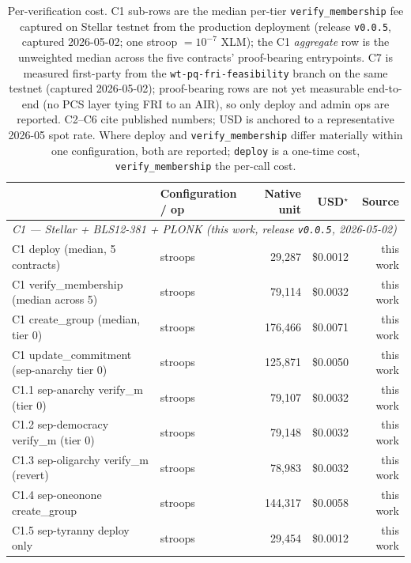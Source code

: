 \begin{table}[t]
  \centering
  \caption{Per-verification cost. C1 sub-rows are the median per-tier
    \texttt{verify\_membership} fee captured on Stellar testnet from
    the production deployment (release \texttt{v0.0.5}, captured
    2026-05-02; one stroop $=10^{-7}$ XLM); the C1 \emph{aggregate}
    row is the unweighted median across the five contracts'
    proof-bearing entrypoints. C7 is measured first-party from the
    \texttt{wt-pq-fri-feasibility} branch on the same testnet
    (captured 2026-05-02); proof-bearing rows are not yet measurable
    end-to-end (no PCS layer tying FRI to an AIR), so only deploy and
    admin ops are reported. C2--C6 cite published numbers; USD is
    anchored to a representative 2026-05 spot rate. Where deploy and
    \texttt{verify\_membership} differ materially within one
    configuration, both are reported; \texttt{deploy} is a
    one-time cost, \texttt{verify\_membership} the per-call cost.}
  \label{tab:cost}
  \begin{tabular}{llrrr}
    \toprule
    & Configuration / op & Native unit & USD$^\star$ & Source \\
    \midrule
    \multicolumn{5}{l}{\emph{C1 --- Stellar + BLS12-381 + PLONK (this work, release \texttt{v0.0.5}, 2026-05-02)}} \\
    \quad C1 deploy (median, 5 contracts)              & stroops   & 29{,}287    & \$0.0012  & this work \\
    \quad C1 verify\_membership (median across 5)      & stroops   & 79{,}114    & \$0.0032  & this work \\
    \quad C1 create\_group (median, tier 0)            & stroops   & 176{,}466   & \$0.0071  & this work \\
    \quad C1 update\_commitment (sep-anarchy tier 0)   & stroops   & 125{,}871   & \$0.0050  & this work \\
    \quad \quad C1.1 sep-anarchy verify\_m (tier 0)    & stroops   & 79{,}107    & \$0.0032  & this work \\
    \quad \quad C1.2 sep-democracy verify\_m (tier 0)  & stroops   & 79{,}148    & \$0.0032  & this work \\
    \quad \quad C1.3 sep-oligarchy verify\_m (revert)  & stroops   & 78{,}983    & \$0.0032  & this work \\
    \quad \quad C1.4 sep-oneonone create\_group        & stroops   & 144{,}317   & \$0.0058  & this work \\
    \quad \quad C1.5 sep-tyranny deploy only           & stroops   & 29{,}454    & \$0.0012  & this work \\

\end{tabular}
\end{table}
